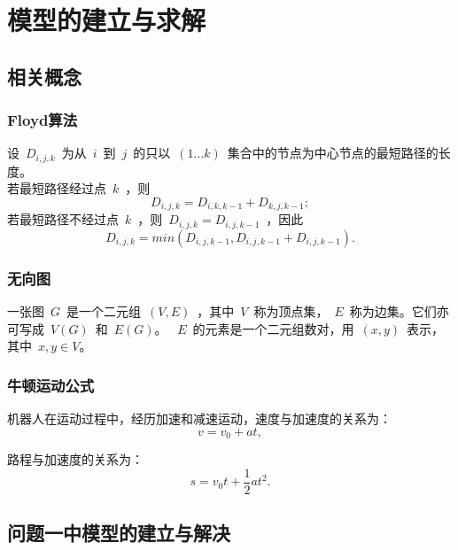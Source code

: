 \documentclass{JXUSTmodeling}
\begin{document}
\section{模型的建立与求解}\label{sec:5}
\subsection{相关概念}\label{sec:5.1}
\subsubsection{Floyd算法}\label{sec:5.1.1}
设~$D_{i,j,k}$~为从~$i$~到~$j$~的只以~$(1\dots k)$~集合中的节点为中心节点的最短路径的长度。\\
若最短路径经过点~$k$~，则
\begin{equation}
  D_{i,j,k} = D_{i,k,k-1}+D_{k,j,k-1};
\end{equation}
若最短路径不经过点~$k$~，则~$D_{i,j,k}=D_{i,j,k-1}$~，因此
\begin{equation}
  D_{i,j,k}=min(D_{i,j,k-1},D_{i,j,k-1}+D_{i,j,k-1}).
\end{equation}
\subsubsection{无向图}\label{sec:5.1.2}
一张图~$G$~是一个二元组~$(V,E)$~，其中~$V$~称为顶点集，~$E$~称为边集。它们亦可写成~$V(G)$~和~$E(G)$。
~$E$~的元素是一个二元组数对，用~$(x,y)$~表示，其中~$x,y\in V$。
\subsubsection{牛顿运动公式}\label{sec:5.1.3}
机器人在运动过程中，经历加速和减速运动，速度与加速度的关系为：
\begin{equation}
  v=v_0+at,
\end{equation}

路程与加速度的关系为：
\begin{equation}
  s= v_0 t+ \frac{1}{2} at^2.  
\end{equation}

\subsection{问题一中模型的建立与解决}\label{sec:5.2}
\end{document}
